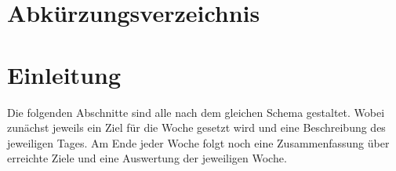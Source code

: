 \documentclass[12pt,a4paper,bibliography=totocnumbered,listof=totocnumbered]{scrartcl}
\begin{document}
\section{Abkürzungsverzeichnis}
\begin{acronym}[OSGi] %
	\setlength{\itemsep}{-\parsep} %
\end{acronym}
\newpage


\renewcommand{\sectionmark}[1]{\markright{#1}}
\renewcommand{\subsectionmark}[1]{}
\renewcommand{\subsubsectionmark}[1]{}
\rhead{\rightmark}

\onehalfspacing
\renewcommand{\thesection}{\arabic{section}}
\renewcommand{\theHsection}{\arabic{section}}
\setcounter{section}{0}
\setcounter{page}{1}

\section{Einleitung}
Die folgenden Abschnitte sind alle nach dem gleichen Schema gestaltet. Wobei zunächst jeweils ein Ziel für die Woche gesetzt wird und eine Beschreibung des jeweiligen Tages. Am Ende jeder Woche folgt noch eine Zusammenfassung über erreichte Ziele und eine Auswertung der jeweiligen Woche. 
\end{document}
